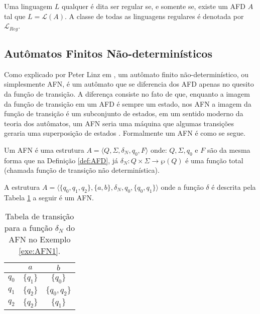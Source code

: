 \begin{definition}\label{def:LinguagensRegulares}
	Uma linguagem $L$ qualquer é dita ser regular se, e somente se, existe um AFD $A$ tal que $L = \mathcal{L}(A)$. A classe de todas as linguagens regulares é denotada por $\mathcal{L}_{Reg}$.
\end{definition}

\subsection{Autômatos Finitos Não-determinísticos}\label{subsec:AFN}

Como explicado por Peter Linz em \cite{linz2006}, um autômato finito não-determinístico, ou simplesmente AFN, é um autômato que se diferencia dos AFD apenas no quesito da função de transição. A diferença consiste no fato de que, enquanto a imagem da função de transição em um AFD é sempre um estado, nos AFN a imagem da  função de transição é um subconjunto de estados, em um sentido moderno da teoria dos autômatos, um AFN seria uma máquina que algumas transições geraria uma superposição de estados \cite{valdi2020phd}. Formalmente um AFN é como se segue.

\begin{definition}\label{def:AFN}
	Um AFN é uma estrutura $A = \langle Q, \Sigma, \delta_N, q_0, F\rangle$ onde: $Q, \Sigma, q_0$ e $F$ são da mesma forma que na Definição \ref{def:AFD}, já $\delta_N : Q \times \Sigma \rightarrow \wp(Q)$ é uma função total (chamada função de transição não determinística).
\end{definition}

\begin{exem}\label{exe:AFN1}
	A estrutura $A = \langle \{q_0, q_1, q_2\}, \{a, b\}, \delta_N, q_0, \{q_0, q_1\}  \rangle$ onde a função $\delta$ é descrita pela Tabela \ref{tab:DeltaAFN1} a seguir é um AFN.
	
	\begin{table}[h]
		\centering
		\begin{tabular}{c|cc}
			 \backslashbox{$Q$}{$\Sigma$}	& $a$ & $b$\\ \hline
			 $q_0$  & $\{q_1\}$ & $\{q_0\}$\\
			 $q_1$  & $\{q_2\}$ & $\{q_0, q_2\}$\\
			 $q_2$  & $\{q_2\}$ & $\{q_1\}$\\
		\end{tabular}
		\caption{Tabela de transição para a função $\delta_N$ do AFN no Exemplo \ref{exe:AFN1}.}
		\label{tab:DeltaAFN1}
	\end{table}
\end{exem}

